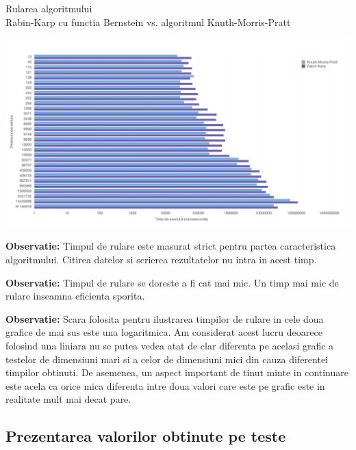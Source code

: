 \documentclass[runningheads]{llncs}
\begin{document}
\pagebreak
\begin{center}
Rularea algoritmului \\ Rabin-Karp cu functia Bernstein vs. algoritmul Knuth-Morris-Pratt
\end{center}
\includegraphics[scale=0.3]{rbvskmp.png}

\par \textbf{Observatie:} Timpul de rulare este masurat strict pentru partea caracteristica algoritmului. Citirea datelor si scrierea rezultatelor nu intra in acest timp. \\

\par \textbf{Observatie:} Timpul de rulare se doreste a fi cat mai mic. Un timp mai mic de rulare inseamna eficienta sporita. \\

\par \textbf{Observatie:} Scara folosita pentru ilustrarea timpilor de rulare in cele doua grafice de mai sus este una logaritmica. Am considerat acest lucru deoarece folosind una liniara nu se putea vedea atat de clar diferenta pe acelasi grafic a testelor de dimensiuni mari si a celor de dimensiuni mici din cauza diferentei timpilor obtinuti. De asemenea, un aspect important de tinut minte in continuare este acela ca orice mica diferenta intre doua valori care este pe grafic este in realitate mult mai  decat pare.

\subsection{Prezentarea valorilor obtinute pe teste}
\end{document}
